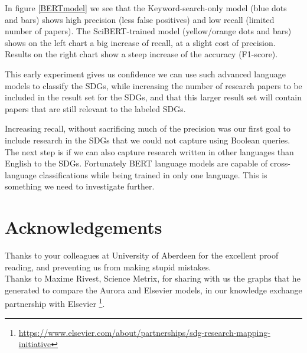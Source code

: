 \documentclass{article}
\begin{document}
In figure \ref{BERTmodel} we see that the Keyword-search-only model (blue dots and bars) shows high precision (less false positives) and low recall (limited number of papers). The SciBERT-trained model (yellow/orange dots and bars) shows on the left chart a big increase of recall, at a slight cost of precision. Results on the right chart show a steep increase of the accuracy (F1-score).

This early experiment gives us confidence we can use such advanced language models to classify the SDGs, while increasing the number of research papers to be included in the result set for the SDGs, and that this larger result set will contain papers that are still relevant to the labeled SDGs.

Increasing recall, without sacrificing much of the precision was our first goal to include research in the SDGs that we could not capture using Boolean queries. The next step is if we can also capture research written in other languages than English to the SDGs. Fortunately BERT language models are capable of cross-language classifications while being trained in only one language. This is something we need to investigate further.

\section{Acknowledgements}
Thanks to your colleagues at University of Aberdeen for the excellent proof reading, and preventing us from making stupid mistakes.\\
Thanks to Maxime Rivest, Science Metrix, for sharing with us the graphs that he generated to compare the Aurora and Elsevier models, in our knowledge exchange partnership with Elsevier \footnote{ \url{https://www.elsevier.com/about/partnerships/sdg-research-mapping-initiative}}. 

  

\end{document}
